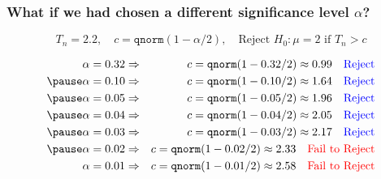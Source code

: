 \begin{frame}
  \frametitle{What if we had chosen a different significance level $\alpha$?}

  \vspace{-2em}

  \[\boxed{T_n = 2.2, \quad c = \texttt{qnorm}(1 -\alpha/2), \quad \mbox{Reject } H_0\colon \mu = 2 \mbox{ if } T_n > c}\]

  \vspace{-2em}

  \pause

  \begin{eqnarray*}
    \alpha = 0.32 &\Rightarrow& c = \texttt{qnorm}(1 - 0.32/2) \approx 0.99 \quad \mbox{\textcolor{blue}{Reject}}\\ \pause
    \alpha = 0.10 &\Rightarrow& c = \texttt{qnorm}(1 - 0.10/2) \approx 1.64\quad \mbox{\textcolor{blue}{Reject}}\\  \pause
    \alpha = 0.05 &\Rightarrow& c = \texttt{qnorm}(1 - 0.05/2) \approx 1.96 \quad \mbox{\textcolor{blue}{Reject}}\\ \pause
    \alpha = 0.04 &\Rightarrow& c = \texttt{qnorm}(1 - 0.04/2) \approx 2.05\quad \mbox{\textcolor{blue}{Reject}}\\  \pause
    \alpha = 0.03 &\Rightarrow& c = \texttt{qnorm}(1 - 0.03/2) \approx 2.17\quad \mbox{\textcolor{blue}{Reject}}\\  \pause
    \alpha = 0.02 &\Rightarrow& c = \texttt{qnorm}(1 - 0.02/2) \approx 2.33 \quad \mbox{\textcolor{red}{Fail to Reject}}\\
    \alpha = 0.01 &\Rightarrow& c = \texttt{qnorm}(1 - 0.01/2) \approx 2.58 \quad \mbox{\textcolor{red}{Fail to Reject}}
  \end{eqnarray*}

  
\end{frame}
